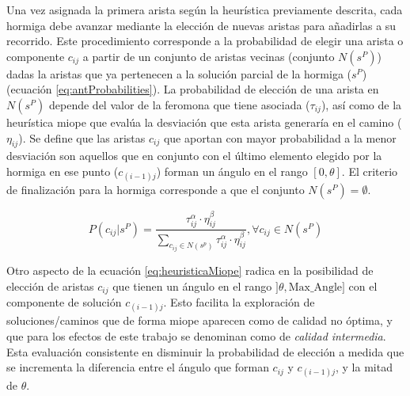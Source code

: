 Una vez asignada la primera arista seg\'un la heur\'istica previamente descrita, cada hormiga debe avanzar mediante la elecci\'on de nuevas aristas para a\~nadirlas a su recorrido. Este procedimiento corresponde a la probabilidad de elegir una arista o componente $c_{ij}$ a partir de un conjunto de aristas vecinas (conjunto $N(s^{P})$) dadas la aristas que ya pertenecen a la soluci\'on parcial de la hormiga ($s^P$) (ecuaci\'on \eqref{eq:antProbabilities}). La probabilidad de elecci\'on de una arista en $N(s^{P})$ depende del valor de la feromona que tiene asociada ($\tau_{ij}$), as\'i como de la heur\'istica miope que eval\'ua la desviaci\'on que esta arista generar\'ia en el camino ($\eta_{ij}$). 
Se define que las aristas $c_{ij}$ que aportan con mayor probabilidad a la menor desviaci\'on son aquellos que en conjunto con el \'ultimo elemento elegido por la hormiga en ese punto ($c_{(i-1)j}$) forman un \'angulo en el rango $[0, \theta]$. El criterio de finalizaci\'on para la hormiga corresponde a que el conjunto $N(s^{P}) = \emptyset$.

\begin{equation}
P(c_{ij} | s^{P}) = \frac
        {\tau_{ij}^{\alpha} \cdot \eta_{ij}^{\beta}}
        {\sum\limits_{c_{ij}\in N(s^p)}{\tau_{ij}^{\alpha} \cdot \eta_{ij}^{\beta} } }, \forall c_{ij} \in N(s^{P})
\label{eq:antProbabilities}
\end{equation}

Otro aspecto de la ecuaci\'on \eqref{eq:heuristicaMiope} radica en la posibilidad de elecci\'on de aristas $c_{ij}$ que tienen un \'angulo en el rango $]\theta, \text{Max\_Angle}]$ con el componente de soluci\'on $c_{(i-1)j}$. Esto facilita la exploraci\'on de soluciones/caminos que de forma miope aparecen como de calidad no \'optima, y que para los efectos de este trabajo se denominan como de {\it calidad intermedia}. Esta evaluaci\'on consistente en disminuir la probabilidad de elecci\'on a medida que se incrementa la diferencia entre el \'angulo que forman $c_{ij}$ y $c_{(i-1)j}$, y la mitad de $\theta$.



